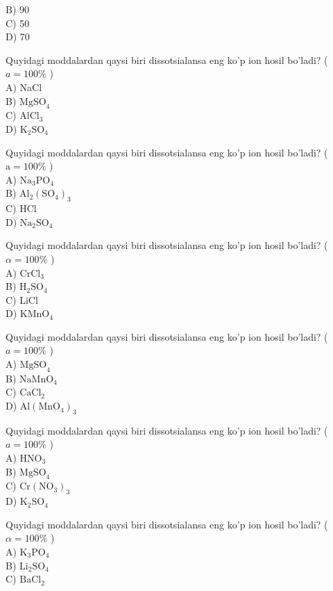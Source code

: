 B) 90\\
C) 50\\
D) 70
  \item Quyidagi moddalardan qaysi biri dissotsialansa eng ko'p ion hosil bo'ladi? ( $a=100 \%$ )\\
A) NaCl\\
B) $\mathrm{MgSO}_{4}$\\
C) $\mathrm{AlCl}_{3}$\\
D) $\mathrm{K}_{2} \mathrm{SO}_{4}$
  \item Quyidagi moddalardan qaysi biri dissotsialansa eng ko'p ion hosil bo'ladi? ( $\mathrm{a}=100 \%$ )\\
A) $\mathrm{Na}_{3} \mathrm{PO}_{4}$\\
B) $\mathrm{Al}_{2}\left(\mathrm{SO}_{4}\right)_{3}$\\
C) HCl\\
D) $\mathrm{Na}_{2} \mathrm{SO}_{4}$
  \item Quyidagi moddalardan qaysi biri dissotsialansa eng ko'p ion hosil bo'ladi? ( $\alpha=100 \%$ )\\
A) $\mathrm{CrCl}_{3}$\\
B) $\mathrm{H}_{2} \mathrm{SO}_{4}$\\
C) LiCl\\
D) $\mathrm{KMnO}_{4}$
  \item Quyidagi moddalardan qaysi biri dissotsialansa eng ko'p ion hosil bo'ladi? ( $a=100 \%$ )\\
A) $\mathrm{MgSO}_{4}$\\
B) $\mathrm{NaMnO}_{4}$\\
C) $\mathrm{CaCl}_{2}$\\
D) $\mathrm{Al}\left(\mathrm{MnO}_{4}\right)_{3}$
  \item Quyidagi moddalardan qaysi biri dissotsialansa eng ko'p ion hosil bo'ladi? ( $a=100 \%$ )\\
A) $\mathrm{HNO}_{3}$\\
B) $\mathrm{MgSO}_{4}$\\
C) $\mathrm{Cr}\left(\mathrm{NO}_{3}\right)_{3}$\\
D) $\mathrm{K}_{2} \mathrm{SO}_{4}$
  \item Quyidagi moddalardan qaysi biri dissotsialansa eng ko'p ion hosil bo'ladi? ( $\alpha=100 \%$ )\\
A) $\mathrm{K}_{3} \mathrm{PO}_{4}$\\
B) $\mathrm{Li}_{2} \mathrm{SO}_{4}$\\
C) $\mathrm{BaCl}_{2}$\\
